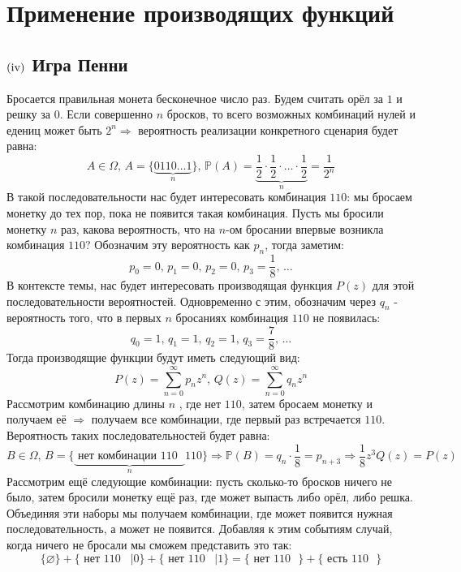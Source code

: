 \documentclass[12pt]{article}
\newcommand{\RN}[1]{%
	\textup{\uppercase\expandafter{\romannumeral#1}}%
}
\newcommand{\MTP}{\mathbb{P}}
\newcommand{\VN}{\varnothing}
\theoremstyle{definition}
\newcommand{\ddsum}[2]{\displaystyle\sum\limits_{#1}^{#2}}
\begin{document}
\lhead{Математический анализ - \RN{3}}
\section*{Применение производящих функций}
\subsection*{$(\RN{4})$ Игра Пенни}
Бросается правильная монета бесконечное число раз. Будем считать орёл за $1$ и решку за $0$. Если совершенно $n$ бросков, то всего возможных комбинаций нулей и едениц может быть $2^n \Rightarrow$ вероятность реализации конкретного сценария будет равна: 
$$
	A \in \Omega, \, A = \{\underbrace{0110 \dotsc 1}_{n}\}, \, \MTP(A) = \underbrace{\dfrac{1}{2}{\cdot}\dfrac{1}{2}{\cdot}\dotsc{\cdot}\dfrac{1}{2}}_{n} =  \dfrac{1}{2^n}
$$ 
В такой последовательности нас будет интересовать  комбинация $110$: мы бросаем монетку до тех пор, пока не появится такая комбинация. Пусть мы бросили монетку $n$ раз, какова вероятность, что на $n$-ом бросании впервые возникла комбинация $110$? Обозначим эту вероятность как $p_n$, тогда заметим: 
$$
	p_0 = 0, \, p_1 = 0, \, p_2 = 0, \, p_3 = \dfrac{1}{8}, \, \dotsc
$$
В контексте темы, нас будет интересовать производящая функция $P(z)$ для этой последовательности вероятностей. Одновременно с этим, обозначим через $q_n$ - вероятность того, что в первых $n$ бросаниях комбинация $110$ не появилась:
$$
	q_0 = 1, \, q_1 = 1, \, q_2 = 1, \, q_3 = \dfrac{7}{8}, \, \dotsc
$$
Тогда производящие функции будут иметь следующий вид:
$$
	P(z) = \ddsum{n = 0}{\infty}p_n z^n, \, Q(z) = \ddsum{n = 0}{\infty}q_n z^n
$$
Рассмотрим комбинацию длины $n$ , где нет $110$, затем бросаем монетку и получаем её $\Rightarrow$ получаем все комбинации, где первый раз встречается $110$. Вероятность  таких последовательностей будет равна:
$$
	B \in \Omega, \, B = \{\underbrace{\text{ нет комбинации $110$ }}_{n} 110\} \Rightarrow \MTP(B) = q_n{\cdot}\dfrac{1}{8} = p_{n + 3} \Rightarrow \dfrac{1}{8}z^3 Q(z) = P(z)
$$
Рассмотрим ещё следующие комбинации: пусть сколько-то бросков ничего не было, затем бросили монетку ещё раз, где может выпасть либо орёл, либо решка. Объединяя эти наборы мы получаем комбинации, где может появится нужная последовательность, а может не появится. Добавляя к этим событиям случай, когда ничего не бросали мы сможем представить это так:
$$
	\{ \VN \} + \{\text{ нет $110$ } \, |0\} + \{\text{ нет $110$ } \, |1\} = 	\{\text{ нет $110$ } \} + 	\{\text{ есть $110$ } \}
$$
\end{document}

